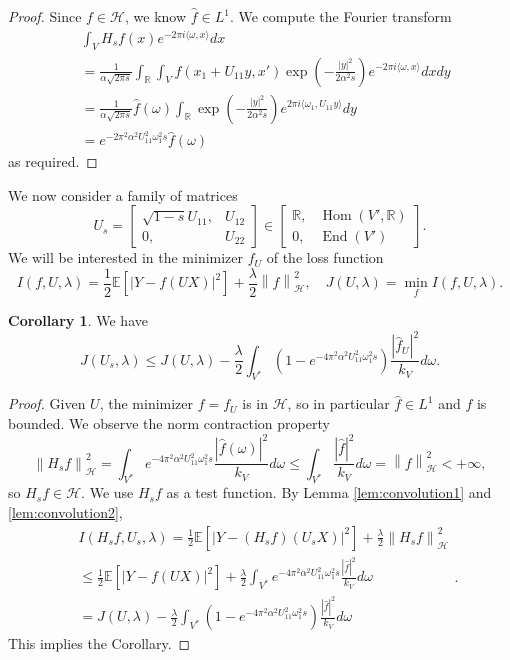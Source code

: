 \documentclass[a4paper]{article}
\theoremstyle{definition}
\newtheorem{cor}[thm]{Corollary}
\newcommand{\R}{\mathbb{R}}
\newcommand{\norm}[1]{\left\lVert#1\right\rVert}
\newcommand{\E}{\mathbb{E}}
\newcommand{\1}{\mathbbm{1}}
\DeclareMathOperator{\Hom}{Hom}
\DeclareMathOperator{\End}{End}
\begin{document}
	
	\begin{proof}
		Since $f\in \mathcal{H}$, we know $\hat{f}\in L^1$.
		We compute the Fourier transform 
		\[
		\begin{split}
			& \int_{V} H_sf(x)e^{-2\pi i \langle \omega, x\rangle} dx
			\\
			& = \frac{1}{\alpha \sqrt{2\pi s}  } \int_{ \R }\int_{V} f(x_1+ U_{11} y, x' ) \exp( -\frac{|y|^2}{2\alpha^2 s}) e^{-2\pi i \langle \omega, x\rangle} dx dy
			\\
			& =
			\frac{1}{\alpha \sqrt{2\pi s}  } \hat{f}(\omega) \int_{ \R } \exp( -\frac{|y|^2}{2\alpha^2 s}) e^{2\pi i \langle \omega_1, U_{11}y\rangle}  dy
			\\
			& = e^{-2\pi^2\alpha^2U_{11}^2 \omega_1^2 s} \hat{f}(\omega)
		\end{split}
		\]
		as  required.
	\end{proof}
	
	
	
	
	
	
	We now consider a family of matrices 
	\[
	U_s= \begin{bmatrix}
		\sqrt{1-s}U_{11}, & U_{12}\\
		0, & U_{22}
	\end{bmatrix} \in \begin{bmatrix}
		\R, & \Hom(V', \R) \\
		0, & \End(V')
	\end{bmatrix}.
	\]
	We will be interested in the minimizer $f_U$ of the loss function
	\[
	I(f, U, \lambda)= \frac{1}{2} \E[|Y-f(UX)|^2] + \frac{\lambda}{2} \norm{f}_{\mathcal{H}}^2,\quad J(U,\lambda)=\min_f I(f, U, \lambda).
	\]
	
	
	
	\begin{cor}\label{cor:convolution}
		We have
		\[
		J(U_s,\lambda)\leq  J(U,\lambda)-  \frac{\lambda}{2}\int_{V^*} (1-e^{-4\pi^2\alpha^2U_{11}^2\omega_1^2 s}) \frac{ |\hat{f}_U|^2}{k_V} d\omega.
		\]
	\end{cor}
	
	\begin{proof}
		Given $U$, the minimizer $f=f_U$ is in $\mathcal{H}$, so in particular $\hat{f}\in L^1$ and $f$ is bounded. We observe the norm contraction property
		\[
		\norm{ H_s f}_{\mathcal{H}}^2= \int_{V^*} e^{-4\pi^2\alpha^2U_{11}^2\omega_1^2 s} \frac{ |\hat{f}(\omega)|^2}{k_V} d\omega\leq  \int_{V^*}  \frac{ |\hat{f}|^2}{k_V} d\omega= \norm{f}_{\mathcal{H}}^2<+\infty,
		\]
		so $H_s f\in \mathcal{H}$. We use $H_sf$ as a test function. By Lemma \ref{lem:convolution1} and \ref{lem:convolution2},
		\[
		\begin{split}
			& I(H_s f, U_s, \lambda)=
			\frac{1}{2}\E [| Y-(H_s f)( U_s X)|^2]+ \frac{ \lambda  }{2} \norm{H_sf}_{\mathcal{H}}^2 
			\\
			& \leq \frac{1}{2}\E[|Y-f(UX)|^2]+ \frac{  \lambda }{2}\int_{V^*} e^{-4\pi^2\alpha^2U_{11}^2\omega_1^2 s} \frac{ |\hat{f}|^2}{k_V} d\omega
			\\
			& = J(U,\lambda)-  \frac{\lambda }{2}\int_{V^*} (1-e^{-4\pi^2\alpha^2U_{11}^2\omega_1^2 s}) \frac{ |\hat{f}|^2}{k_V} d\omega
		\end{split}.
		\]
		This implies the Corollary.
	\end{proof}
	
\end{document}
